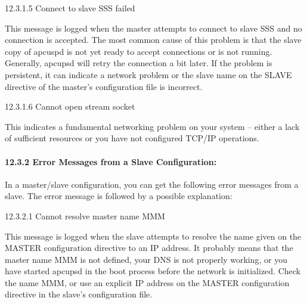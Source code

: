 {{{{{{{{{\label{Connect-to-slave-SSS-failed}

{\small12.3.1.5 Connect to slave SSS failed}

This message is logged when the master attempts to connect to slave SSS and no
connection is accepted. The most common cause of this problem is that the
slave copy of apcuspd is not yet ready to accept connections or is not
running. Generally, apcupsd will retry the connection a bit later. If the
problem is persistent, it can indicate a network problem or the slave name on
the SLAVE directive of the master's configuration file is incorrect. 

\label{Cannot-open-stream-socket}

{\small12.3.1.6 Cannot open stream socket}

This indicates a fundamental networking problem on your system {--} either a
lack of sufficient resources or you have not configured TCP/IP operations. 

\label{Error-Messages-from-a-Slave-Configuration}

\paragraph*{12.3.2 Error Messages from a Slave Configuration:}

In a master/slave configuration, you can get the following error messages from
a slave. The error message is followed by a possible explanation: 

\label{Cannot-resolve-master-name-MMM}

{\small12.3.2.1 Cannot resolve master name MMM}

This message is logged when the slave attempts to resolve the name given on
the MASTER configuration directive to an IP address. It probably means that
the master name MMM is not defined, your DNS is not properly working, or you
have started apcupsd in the boot process before the network is initialized.
Check the name MMM, or use an explicit IP address on the MASTER configuration
directive in the slave's configuration file. 

}}}}}}}}}
